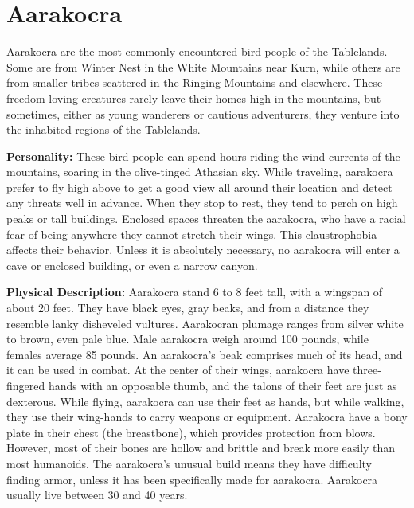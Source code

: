 \section{Aarakocra}

Aarakocra are the most commonly encountered bird-people of the Tablelands. Some are from Winter Nest in the White Mountains near Kurn, while others are from smaller tribes scattered in the Ringing Mountains and elsewhere. These freedom-loving creatures rarely leave their homes high in the mountains, but sometimes, either as young wanderers or cautious adventurers, they venture into the inhabited regions of the Tablelands.

\textbf{Personality:} These bird-people can spend hours riding the wind currents of the mountains, soaring in the olive-tinged Athasian sky. While traveling, aarakocra prefer to fly high above to get a good view all around their location and detect any threats well in advance. When they stop to rest, they tend to perch on high peaks or tall buildings. Enclosed spaces threaten the aarakocra, who have a racial fear of being anywhere they cannot stretch their wings. This claustrophobia affects their behavior. Unless it is absolutely necessary, no aarakocra will enter a cave or enclosed building, or even a narrow canyon.

\textbf{Physical Description:} Aarakocra stand 6 \onehalf to 8 feet tall, with a wingspan of about 20 feet. They have black eyes, gray beaks, and from a distance they resemble lanky disheveled vultures. Aarakocran plumage ranges from silver white to brown, even pale blue. Male aarakocra weigh around 100 pounds, while females average 85 pounds. An aarakocra's beak comprises much of its head, and it can be used in combat. At the center of their wings, aarakocra have three-fingered hands with an opposable thumb, and the talons of their feet are just as dexterous. While flying, aarakocra can use their feet as hands, but while walking, they use their wing-hands to carry weapons or equipment. Aarakocra have a bony plate in their chest (the breastbone), which provides protection from blows. However, most of their bones are hollow and brittle and break more easily than most humanoids. The aarakocra's unusual build means they have difficulty finding armor, unless it has been specifically made for aarakocra. Aarakocra usually live between 30 and 40 years.

